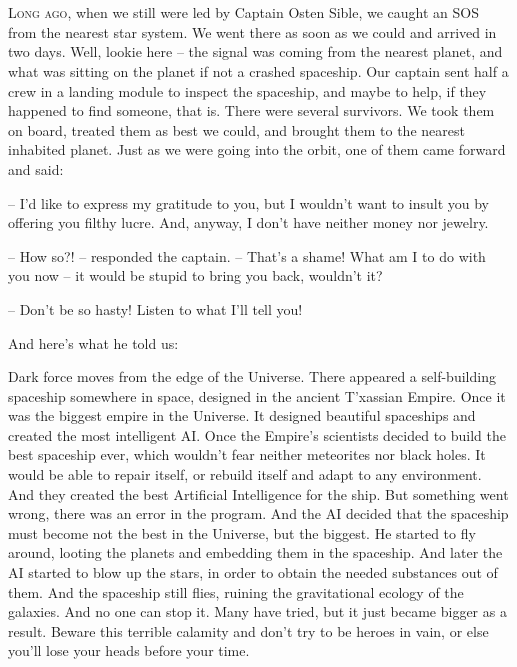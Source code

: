 \documentclass[ebook,oneside,final,openright]{memoir}
\begin{document}
\chapter{}
\par
\lettrine{L}{ong ago,} when we still were led by Captain Osten Sible, we caught an SOS from the nearest star system. We went there as soon as we could and arrived in two days. Well, lookie here – the signal was coming from the nearest planet, and what was sitting on the planet if not a crashed spaceship. Our captain sent half a crew in a landing module to inspect the spaceship, and maybe to help, if they happened to find someone, that is. There were several survivors. We took them on board, treated them as best we could, and brought them to the nearest inhabited planet. Just as we were going into the orbit, one of them came forward and said: \par
\par
– I’d like to express my gratitude to you, but I wouldn’t want to insult you by offering you filthy lucre. And, anyway, I don’t have neither money nor jewelry.\par
– How so?! – responded the captain. – That’s a shame! What am I to do with you now – it would be stupid to bring you back, wouldn’t it? \par
– Don’t be so hasty! Listen to what I’ll tell you! \par
 And here’s what he told us:\par
\par
Dark force moves from the edge of the Universe. There appeared a self-building spaceship somewhere in space, designed in the ancient T’xassian Empire. Once it was the biggest empire in the Universe. It designed beautiful spaceships and created the most intelligent AI. Once the Empire’s scientists decided to build the best spaceship ever, which wouldn’t fear neither meteorites nor black holes. It would be able to repair itself, or rebuild itself and adapt to any environment. And they created the best Artificial Intelligence for the ship. But something went wrong, there was an error in the program. And the AI decided that the spaceship must become not the best in the Universe, but the biggest. He started to fly around, looting the planets and embedding them in the spaceship. And later the AI started to blow up the stars, in order to obtain the needed substances out of them. And the spaceship still flies, ruining the gravitational ecology of the galaxies. And no one can stop it. Many have tried, but it just became bigger as a result. Beware this terrible calamity and don’t try to be heroes in vain, or else you’ll lose your heads before your time.\par
\end{document}
